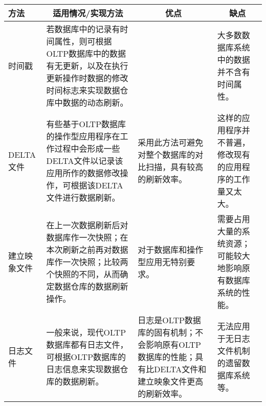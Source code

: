 \begin{spacing}{1.2}
    \centering
    \begin{longtable}{|m{1.2cm}<{\centering}|m{4.7cm}|m{4.7cm}|m{3.3cm}|}
        \hline
        方法      & \multicolumn{1}{c|}{适用情况/实现方法}                                                               & \multicolumn{1}{c|}{优点}                                                         & \multicolumn{1}{c|}{缺点}                             \\ \hline
        时间戳     & 若数据库中的记录有时间属性，则可根据OLTP数据库中的数据有无更新，以及在执行更新操作时数据的修改时间标志来实现数据仓库中数据的动态刷新。   &                                                            & 大多数数据库系统中的数据并不含有时间属性。          \\ \hline
        DELTA文件 & 有些基于OLTP数据库的操作型应用程序在工作过程中会形成一些DELTA文件以记录该应用所作的数据修改操作，可根据该DELTA文件进行数据刷新。 & 采用此方法可避免对整个数据库的对比扫描，具有较高的刷新效率。                             & 这样的应用程序并不普遍，修改现有的应用程序的工作量又太大。  \\ \hline
        建立映象文件  & 在上一次数据刷新后对数据库作一次快照；在本次刷新之前再对数据库作一次快照；比较两个快照的不同，从而确定数据仓库的数据刷新操作。         & 对于数据库和操作型应用无特别要求。                                          & 需要占用大量的系统资源；可能较大地影响原有数据库系统的性能。 \\ \hline
        日志文件    & 一般来说，现代OLTP数据库都有日志文件，可根据OLTP数据库的日志信息来实现数据仓库的数据刷新。                       & 日志是OLTP数据库的固有机制；不会影响原有OLTP数据库的性能；具有比DELTA文件和建立映象文件更高的刷新效率。 & 无法应用于无日志文件机制的遗留数据库系统等。         \\ \hline
    \end{longtable}
	\end{spacing}
\vspace{-0.5em}